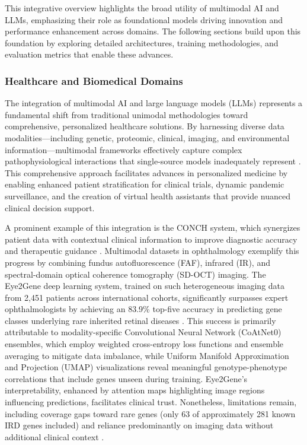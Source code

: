 \documentclass[sigconf]{acmart}
\begin{document}
This integrative overview highlights the broad utility of multimodal AI and LLMs, emphasizing their role as foundational models driving innovation and performance enhancement across domains. The following sections build upon this foundation by exploring detailed architectures, training methodologies, and evaluation metrics that enable these advances.

\subsubsection{Healthcare and Biomedical Domains}

The integration of multimodal AI and large language models (LLMs) represents a fundamental shift from traditional unimodal methodologies toward comprehensive, personalized healthcare solutions. By harnessing diverse data modalities—including genetic, proteomic, clinical, imaging, and environmental information—multimodal frameworks effectively capture complex pathophysiological interactions that single-source models inadequately represent \cite{ref12}. This comprehensive approach facilitates advances in personalized medicine by enabling enhanced patient stratification for clinical trials, dynamic pandemic surveillance, and the creation of virtual health assistants that provide nuanced clinical decision support.

A prominent example of this integration is the CONCH system, which synergizes patient data with contextual clinical information to improve diagnostic accuracy and therapeutic guidance \cite{ref12}. Multimodal datasets in ophthalmology exemplify this progress by combining fundus autofluorescence (FAF), infrared (IR), and spectral-domain optical coherence tomography (SD-OCT) imaging. The Eye2Gene deep learning system, trained on such heterogeneous imaging data from 2,451 patients across international cohorts, significantly surpasses expert ophthalmologists by achieving an 83.9\% top-five accuracy in predicting gene classes underlying rare inherited retinal diseases \cite{ref10}. This success is primarily attributable to modality-specific Convolutional Neural Network (CoAtNet0) ensembles, which employ weighted cross-entropy loss functions and ensemble averaging to mitigate data imbalance, while Uniform Manifold Approximation and Projection (UMAP) visualizations reveal meaningful genotype-phenotype correlations that include genes unseen during training. Eye2Gene’s interpretability, enhanced by attention maps highlighting image regions influencing predictions, facilitates clinical trust. Nonetheless, limitations remain, including coverage gaps toward rare genes (only 63 of approximately 281 known IRD genes included) and reliance predominantly on imaging data without additional clinical context \cite{ref10}.
\end{document}
